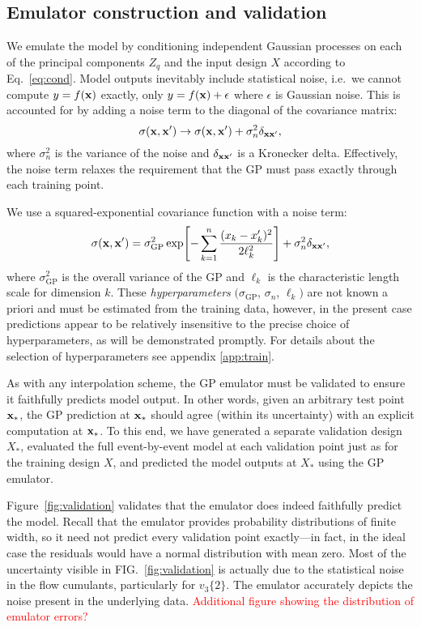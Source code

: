 \documentclass[aps,prc,reprint,amsmath]{revtex4-1}
\newcommand{\todo}[1]{\textcolor{red}{#1}}
\newcommand{\vnk}[2]{v_#1\{#2\}}
\begin{document}
\subsection{Emulator construction and validation}

We emulate the model by conditioning independent Gaussian processes on each of the principal components $Z_q$ and the input design $X$ according to Eq.~\eqref{eq:cond}.
Model outputs inevitably include statistical noise, i.e.\ we cannot compute $y = f(\mathbf x)$ exactly, only $y = f(\mathbf x) + \epsilon$ where $\epsilon$ is Gaussian noise.
This is accounted for by adding a noise term to the diagonal of the covariance matrix:
\begin{equation*}
  \sigma(\mathbf x, \mathbf x') \rightarrow \sigma(\mathbf x, \mathbf x') + \sigma^2_n\delta_{\mathbf x\mathbf x'},
\end{equation*}
where $\sigma^2_n$ is the variance of the noise and $\delta_{\mathbf x\mathbf x'}$ is a Kronecker delta.
Effectively, the noise term relaxes the requirement that the GP must pass exactly through each training point.

We use a squared-exponential covariance function with a noise term:
\begin{equation}
  \sigma(\mathbf x, \mathbf x') = \sigma_\text{GP}^2 \exp\Biggl[ -\sum_{k=1}^n \frac{(x_k - x'_k)^2}{2\ell_k^2} \Biggr] + \sigma_n^2\delta_{\mathbf x\mathbf x'},
\end{equation}
where $\sigma_\text{GP}^2$ is the overall variance of the GP and $\ell_k$ is the characteristic length scale for dimension $k$.
These \emph{hyperparameters} $(\sigma_\text{GP}$, $\sigma_n$, $\ell_k)$ are not known a priori and must be estimated from the training data, however, in the present case predictions appear to be relatively insensitive to the precise choice of hyperparameters, as will be demonstrated promptly.
For details about the selection of hyperparameters see appendix \ref{app:train}.

As with any interpolation scheme, the GP emulator must be validated to ensure it faithfully predicts model output.
In other words, given an arbitrary test point $\mathbf x_*$, the GP prediction at $\mathbf x_*$ should agree (within its uncertainty) with an explicit computation at $\mathbf x_*$.
To this end, we have generated a separate validation design $X_*$, evaluated the full event-by-event model at each validation point just as for the training design $X$, and predicted the model outputs at $X_*$ using the GP emulator.

Figure~\ref{fig:validation} validates that the emulator does indeed faithfully predict the model.
Recall that the emulator provides probability distributions of finite width, so it need not predict every validation point exactly---in fact, in the ideal case the residuals would have a normal distribution with mean zero.
Most of the uncertainty visible in FIG.~\ref{fig:validation} is actually due to the statistical noise in the flow cumulants, particularly for $\vnk 3 2$.
The emulator accurately depicts the noise present in the underlying data.
\todo{Additional figure showing the distribution of emulator errors?}
\end{document}
